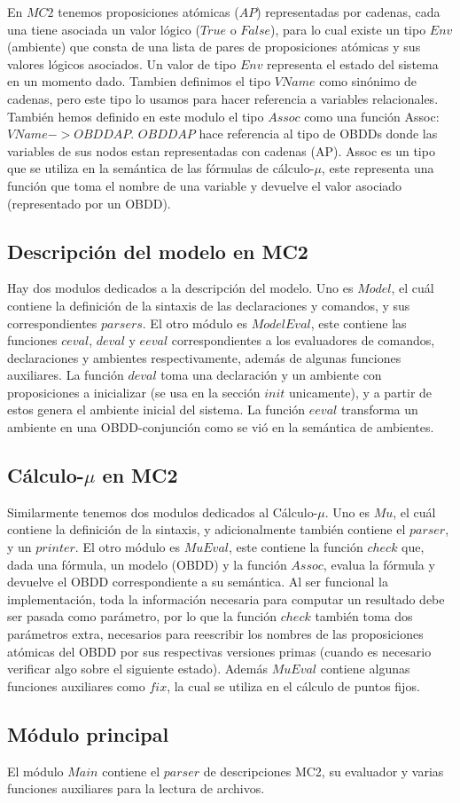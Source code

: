 En $MC2$ tenemos proposiciones atómicas ($AP$) representadas por cadenas, cada una tiene asociada un valor lógico ($True$ o $False$), para lo cual existe un tipo $Env$ (ambiente) que consta de una lista de pares de proposiciones atómicas y sus valores lógicos asociados. Un valor de tipo $Env$ representa el estado del sistema en un momento dado. Tambien definimos el tipo $VName$ como sinónimo de cadenas, pero este tipo lo usamos para hacer referencia a variables relacionales. También hemos definido en este modulo el tipo $Assoc$ como una función Assoc: $VName -> OBDD AP$. $OBDD AP$ hace referencia al tipo de OBDDs donde las variables de sus nodos estan representadas con cadenas (AP). Assoc es un tipo que se utiliza en la semántica de las fórmulas de cálculo-$\mu$, este representa una función que toma el nombre de una variable y devuelve el valor asociado (representado por un OBDD).

\subsection{Descripción del modelo en MC2}

Hay dos modulos dedicados a la descripción del modelo. Uno es $Model$, el cuál contiene la definición de la sintaxis de las declaraciones y comandos, y  sus correspondientes $parsers$. El otro módulo es $ModelEval$, este contiene las funciones $ceval$, $deval$ y $eeval$ correspondientes a los evaluadores de comandos, declaraciones y ambientes respectivamente, además de algunas funciones auxiliares. La función $deval$ toma una declaración y un ambiente con proposiciones a inicializar (se usa en la sección $init$ unicamente), y a partir de estos genera el ambiente inicial del sistema. La función $eeval$ transforma un ambiente en una OBDD-conjunción como se vió en la semántica de ambientes.

\subsection{Cálculo-$\mu$ en MC2}

Similarmente tenemos dos modulos dedicados al Cálculo-$\mu$. Uno es $Mu$, el cuál contiene la definición de la sintaxis, y adicionalmente también contiene el $parser$, y un $printer$. El otro módulo es $MuEval$, este contiene la función $check$ que, dada una fórmula, un modelo (OBDD) y la función $Assoc$, evalua la fórmula y devuelve el OBDD correspondiente a su semántica. Al ser funcional la implementación, toda la información necesaria para computar un resultado debe ser pasada como parámetro, por lo que la función $check$ también toma dos parámetros extra, necesarios para reescribir los nombres de las proposiciones atómicas del OBDD por sus respectivas versiones primas (cuando es necesario verificar algo sobre el siguiente estado). Además $MuEval$ contiene algunas funciones auxiliares como $fix$, la cual se utiliza en el cálculo de puntos fijos.

\subsection{Módulo principal}

El módulo $Main$ contiene el $parser$ de descripciones MC2, su evaluador y varias funciones auxiliares para la lectura de archivos.